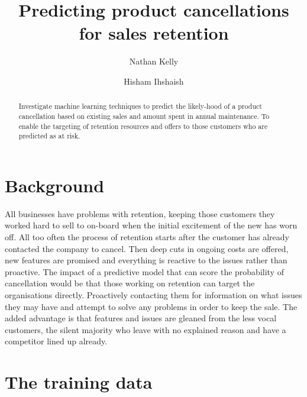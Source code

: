 \documentclass[runningheads]{llncs}
\begin{document}
%
\title{Predicting product cancellations for sales retention}
%
%
\author{Nathan Kelly \and
Hisham Ihshaish}
%
%
%
\maketitle              %
%
\begin{abstract}
Investigate machine learning techniques to predict the likely-hood of a product cancellation based on existing sales and amount spent in annual maintenance. To enable the targeting of retention resources and offers to those customers who are predicted as at risk. 

\end{abstract}
%
%
%
\section{Background}
All businesses have problems with retention, keeping those customers they worked hard to sell to on-board when the initial excitement of the new has worn off. All too often the process of retention starts after the customer has already contacted the company to cancel. Then deep cuts in ongoing costs are offered, new features are promised and everything is reactive to the issues rather than proactive. The impact of a predictive model that can score the probability of cancellation would be that those working on retention can target the organisations directly. Proactively contacting them for information on what issues they may have and attempt to solve any problems in order to keep the sale. The added advantage is that features and issues are gleaned from the less vocal customers, the silent majority who leave with no explained reason and have a competitor lined up already.
%
%
%
\section{The training data}
\end{document}
